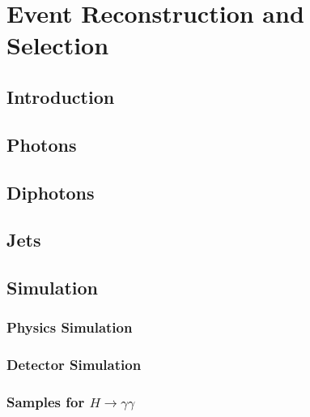 \chapter{Event Reconstruction and Selection}
\label{chap:object_reco}


\newpage

\section{Introduction}


\section{Photons}


\section{Diphotons}


\section{Jets}


\section{Simulation}
\subsection{Physics Simulation}
\subsection{Detector Simulation}
\subsection{Samples for $H\rightarrow\gamma\gamma$}

